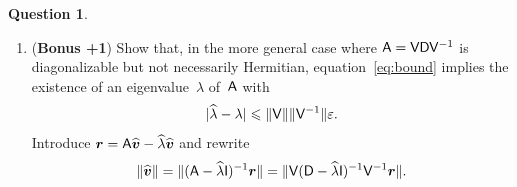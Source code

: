 \documentclass[11pt]{article}
\theoremstyle{definition}
\newtheorem{question}{Question}
\theoremstyle{remark}
\begin{document}
\begin{question}
\begin{enumerate}
        \item
            (\textbf{Bonus +1}) Show that, in the more general case where $\mathsf A = \mathsf V \mathsf D \mathsf V^{-1}$ is diagonalizable but not necessarily Hermitian,
            equation~\eqref{eq:bound} implies the existence of an eigenvalue~$\lambda$ of~$\mathsf A$ with
            \[
                \lvert\widehat \lambda - \lambda\rvert \leqslant \lVert\mathsf V\rVert \lVert\mathsf V^{-1}\rVert \varepsilon.
            \]
            Introduce $\mathbf{\boldsymbol{r}} = \mathsf A \widehat{\mathbf{\boldsymbol{v}}} - \widehat{\lambda} \widehat{\mathbf{\boldsymbol{v}}}$ and rewrite
            \[
                \lVert\widehat {\mathbf{\boldsymbol{v}}}\rVert = \lVert(\mathsf A - \widehat \lambda \mathsf I)^{-1}  {\mathbf{\boldsymbol{r}}}\rVert
                = \lVert\mathsf V (\mathsf D - \widehat \lambda \mathsf I)^{-1}  \mathsf V^{-1} {\mathbf{\boldsymbol{r}}}\rVert.
            \]
    \end{enumerate}
\end{question}
\end{document}
